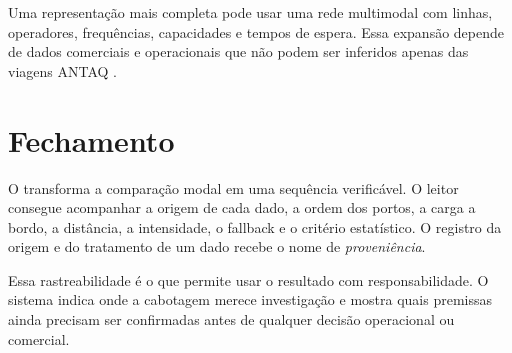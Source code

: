 Uma representação mais completa pode usar uma rede multimodal com linhas, operadores, frequências, capacidades e tempos de espera. Essa expansão depende de dados comerciais e operacionais que não podem ser inferidos apenas das viagens ANTAQ \cite{competitiveness2024,modalshiftreview2020}.

\section{Fechamento}
\label{sec:fechamento}

O \CabotageLens{} transforma a comparação modal em uma sequência verificável. O leitor consegue acompanhar a origem de cada dado, a ordem dos portos, a carga a bordo, a distância, a intensidade, o fallback e o critério estatístico. O registro da origem e do tratamento de um dado recebe o nome de \emph{proveniência}.

Essa rastreabilidade é o que permite usar o resultado com responsabilidade. O sistema indica onde a cabotagem merece investigação e mostra quais premissas ainda precisam ser confirmadas antes de qualquer decisão operacional ou comercial.
